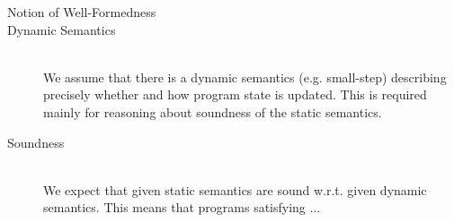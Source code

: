 \begin{description}
    
\item[Notion of Well-Formedness]
    
    
    
\item[Dynamic Semantics]~\\
    We assume that there is a dynamic semantics (e.g. small-step) describing precisely whether and how program state is updated.
    This is required mainly for reasoning about soundness of the static semantics.
    
\item[Soundness]~\\
    We expect that given static semantics are sound w.r.t. given dynamic semantics.
    This means that programs satisfying ... 
\end{description}
